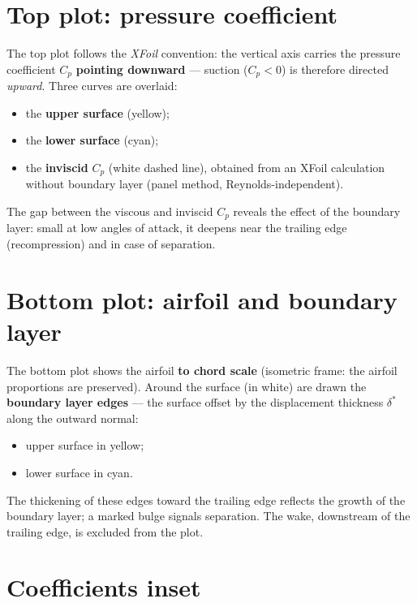 \section{Top plot: pressure coefficient}

The top plot follows the \emph{XFoil} convention: the vertical axis
carries the pressure coefficient $C_p$ \textbf{pointing downward} —
suction ($C_p < 0$) is therefore directed \emph{upward}. Three curves
are overlaid:

\begin{itemize}
    \item the \textbf{upper surface} (yellow);
    \item the \textbf{lower surface} (cyan);
    \item the \textbf{inviscid} $C_p$ (white dashed line), obtained
        from an XFoil calculation without boundary layer (panel
        method, Reynolds-independent).
\end{itemize}

The gap between the viscous and inviscid $C_p$ reveals the effect of
the boundary layer: small at low angles of attack, it deepens near the
trailing edge (recompression) and in case of separation.

\section{Bottom plot: airfoil and boundary layer}

The bottom plot shows the airfoil \textbf{to chord scale} (isometric
frame: the airfoil proportions are preserved). Around the surface (in
white) are drawn the \textbf{boundary layer edges} — the surface
offset by the displacement thickness $\delta^*$ along the outward
normal:

\begin{itemize}
    \item upper surface in yellow;
    \item lower surface in cyan.
\end{itemize}

The thickening of these edges toward the trailing edge reflects the
growth of the boundary layer; a marked bulge signals separation. The
wake, downstream of the trailing edge, is excluded from the plot.

\section{Coefficients inset}


